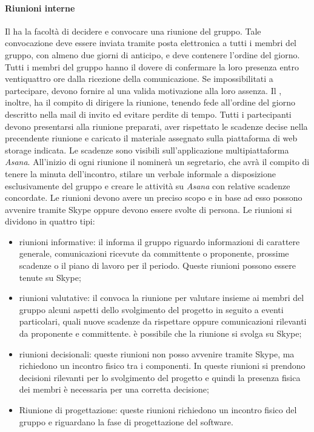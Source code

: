 			\paragraph{Riunioni interne}
			Il \textit{\RdP} ha la facoltà di decidere e convocare una riunione del gruppo. Tale convocazione deve essere inviata tramite posta elettronica a tutti i membri del gruppo, con almeno due giorni di anticipo, e deve contenere l’ordine del giorno. Tutti i membri del gruppo hanno il dovere di confermare la loro presenza entro ventiquattro ore dalla ricezione della comunicazione. Se impossibilitati a partecipare, devono fornire al \textit{\RdP} una valida motivazione alla loro assenza. Il \textit{\RdP}, inoltre, ha il compito di dirigere la riunione, tenendo fede all’ordine del giorno descritto nella mail di invito ed evitare perdite di tempo. Tutti i partecipanti devono presentarsi alla riunione preparati, aver rispettato le scadenze decise nella precendente riunione e caricato il materiale assegnato sulla piattaforma di web storage indicata. Le scadenze sono visibili sull'applicazione multipiattaforma \textit{Asana}.
			All’inizio di ogni riunione il \textit{\RdP} nominerà un segretario, che avrà il compito di tenere la minuta dell’incontro, stilare un verbale informale a disposizione esclusivamente del gruppo e creare le attività su \textit{Asana} con relative scadenze concordate.  
			Le riunioni devono avere un preciso scopo e in base ad esso possono avvenire tramite Skype oppure devono essere svolte di persona. Le riunioni si dividono in quattro tipi:
			\begin{itemize}
				\item riunioni informative: il \RdP informa il gruppo riguardo informazioni di carattere generale, comunicazioni ricevute da committente o proponente, prossime scadenze o il piano di lavoro per il periodo. Queste riunioni possono essere tenute su Skype;
				\item riunioni valutative: il \RdP convoca la riunione per valutare insieme ai membri del gruppo alcuni aspetti dello svolgimento del progetto in seguito a eventi particolari, quali nuove scadenze da rispettare oppure comunicazioni rilevanti da proponente e committente. è possibile che la riunione si svolga su Skype;
				\item riunioni decisionali: queste riunioni non posso avvenire tramite Skype, ma richiedono un incontro fisico tra i componenti. In queste riunioni si prendono decisioni rilevanti per lo svolgimento del progetto e quindi la presenza fisica dei membri è necessaria per una corretta decisione;
				\item Riunione di progettazione: queste riunioni richiedono un incontro fisico del gruppo e riguardano la fase di progettazione del software. 
			\end{itemize}
		
